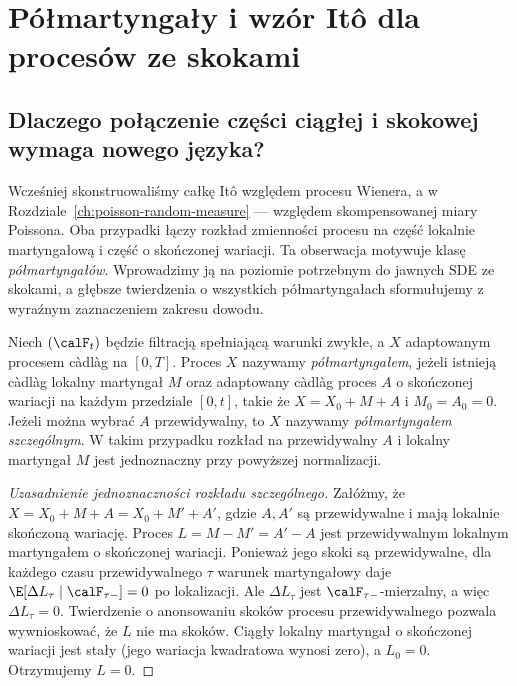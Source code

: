 \chapter{Półmartyngały i wzór Itô dla procesów ze skokami}
\label{ch:semimartingale-jumps}

\section{Dlaczego połączenie części ciągłej i skokowej wymaga nowego języka?}

Wcześniej skonstruowaliśmy całkę Itô względem procesu Wienera,
a w Rozdziale~\ref{ch:poisson-random-measure} --- względem
skompensowanej miary Poissona. Oba przypadki łączy rozkład
zmienności procesu na część lokalnie martyngałową i część o
skończonej wariacji. Ta obserwacja motywuje klasę
\emph{półmartyngałów}. Wprowadzimy ją na poziomie potrzebnym do
jawnych SDE ze skokami, a głębsze twierdzenia o wszystkich
półmartyngałach sformułujemy z wyraźnym zaznaczeniem zakresu dowodu.

\begin{definicja}
\label{def:semimartingale}
Niech $(\calF_t)$ będzie filtracją spełniającą warunki zwykłe,
a $X$ adaptowanym procesem càdlàg na $[0,T]$.
Proces $X$ nazywamy \emph{półmartyngałem}, jeżeli istnieją
càdlàg lokalny martyngał $M$ oraz adaptowany càdlàg proces
$A$ o skończonej wariacji na każdym przedziale $[0,t]$,
takie że $X=X_0+M+A$ i $M_0=A_0=0$.
Jeżeli można wybrać $A$ przewidywalny, to $X$ nazywamy
\emph{półmartyngałem szczególnym}. W takim przypadku
rozkład na przewidywalny $A$ i lokalny martyngał $M$
jest jednoznaczny przy powyższej normalizacji.
\end{definicja}

\begin{proof}[Uzasadnienie jednoznaczności rozkładu szczególnego]
Załóżmy, że $X=X_0+M+A=X_0+M'+A'$, gdzie $A,A'$ są
przewidywalne i mają lokalnie skończoną wariację.
Proces $L=M-M'=A'-A$ jest przewidywalnym lokalnym
martyngałem o skończonej wariacji. Ponieważ jego skoki są
przewidywalne, dla każdego czasu przewidywalnego $\tau$
warunek martyngałowy daje
$\E[\Delta L_\tau\mid\calF_{\tau-}]=0$ po lokalizacji.
Ale $\Delta L_\tau$ jest $\calF_{\tau-}$-mierzalny,
a więc $\Delta L_\tau=0$. Twierdzenie o anonsowaniu
skoków procesu przewidywalnego pozwala wywnioskować,
że $L$ nie ma skoków. Ciągły lokalny martyngał o
skończonej wariacji jest stały (jego wariacja kwadratowa
wynosi zero), a $L_0=0$. Otrzymujemy $L=0$.
\end{proof}

